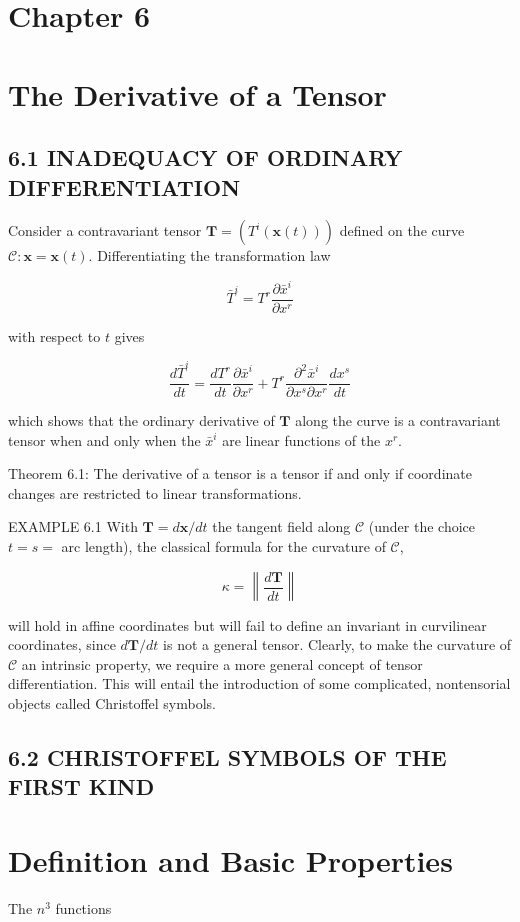 \documentclass[10pt]{article}
\begin{document}
\section*{Chapter 6}
\section*{The Derivative of a Tensor}
\subsection*{6.1 INADEQUACY OF ORDINARY DIFFERENTIATION}
Consider a contravariant tensor $\mathbf{T}=\left(T^{i}(\mathbf{x}(t))\right)$ defined on the curve $\mathscr{C}: \mathbf{x}=\mathbf{x}(t)$. Differentiating the transformation law

$$
\bar{T}^{i}=T^{r} \frac{\partial \bar{x}^{i}}{\partial x^{r}}
$$

with respect to $t$ gives

$$
\frac{d \bar{T}^{i}}{d t}=\frac{d T^{r}}{d t} \frac{\partial \bar{x}^{i}}{\partial x^{r}}+T^{r} \frac{\partial^{2} \bar{x}^{i}}{\partial x^{s} \partial x^{r}} \frac{d x^{s}}{d t}
$$

which shows that the ordinary derivative of $\mathbf{T}$ along the curve is a contravariant tensor when and only when the $\bar{x}^{i}$ are linear functions of the $x^{r}$.

Theorem 6.1: The derivative of a tensor is a tensor if and only if coordinate changes are restricted to linear transformations.

EXAMPLE 6.1 With $\mathbf{T}=d \mathbf{x} / d t$ the tangent field along $\mathscr{C}$ (under the choice $t=s=$ arc length), the classical formula for the curvature of $\mathscr{C}$,

$$
\kappa=\left\|\frac{d \mathbf{T}}{d t}\right\|
$$

will hold in affine coordinates but will fail to define an invariant in curvilinear coordinates, since $d \mathbf{T} / d t$ is not a general tensor. Clearly, to make the curvature of $\mathscr{C}$ an intrinsic property, we require a more general concept of tensor differentiation. This will entail the introduction of some complicated, nontensorial objects called Christoffel symbols.

\subsection*{6.2 CHRISTOFFEL SYMBOLS OF THE FIRST KIND}
\section*{Definition and Basic Properties}
The $n^{3}$ functions
\end{document}
